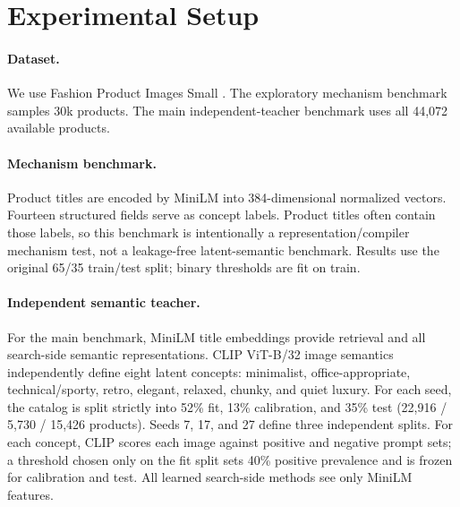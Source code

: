 
\section{Experimental Setup}
\paragraph{Dataset.} We use Fashion Product Images Small \citep{fashiondataset}. The exploratory mechanism benchmark samples 30k products. The main independent-teacher benchmark uses all 44,072 available products.

\paragraph{Mechanism benchmark.} Product titles are encoded by MiniLM \citep{reimers2019sbert,wang2020minilm} into 384-dimensional normalized vectors. Fourteen structured fields serve as concept labels. Product titles often contain those labels, so this benchmark is intentionally a representation/compiler mechanism test, not a leakage-free latent-semantic benchmark. Results use the original 65/35 train/test split; binary thresholds are fit on train.

\paragraph{Independent semantic teacher.} For the main benchmark, MiniLM title embeddings provide retrieval and all search-side semantic representations. CLIP ViT-B/32 image semantics \citep{radford2021clip} independently define eight latent concepts: minimalist, office-appropriate, technical/sporty, retro, elegant, relaxed, chunky, and quiet luxury. For each seed, the catalog is split strictly into 52\% fit, 13\% calibration, and 35\% test (22,916 / 5,730 / 15,426 products). Seeds 7, 17, and 27 define three independent splits. For each concept, CLIP scores each image against positive and negative prompt sets; a threshold chosen only on the fit split sets 40\% positive prevalence and is frozen for calibration and test. All learned search-side methods see only MiniLM features.

